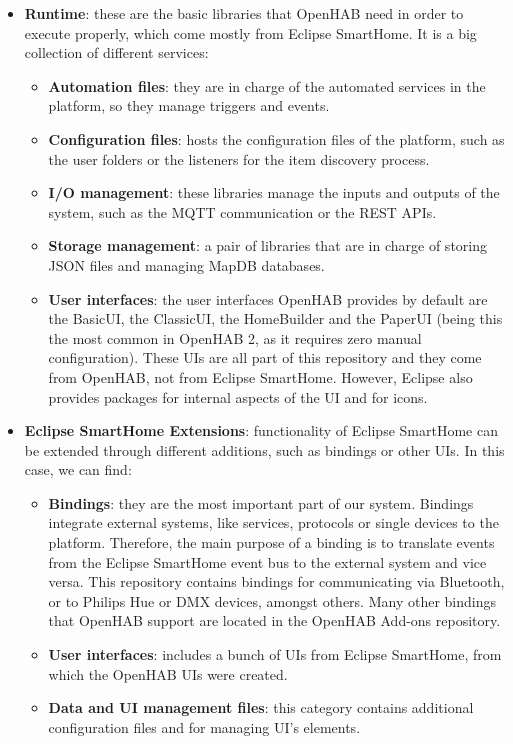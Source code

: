 \begin{itemize}
	\item \textbf{Runtime}: these are the basic libraries that OpenHAB need in order to execute properly, which come mostly from Eclipse
	SmartHome. It is a big collection of different services:
	\begin{itemize}
		\item \textbf{Automation files}: they are in charge of the automated services in the platform, so they manage triggers and events.
		\item \textbf{Configuration files}: hosts the configuration files of the platform, such as the user folders or the listeners for the
		item discovery process.
		\item \textbf{I/O management}: these libraries manage the inputs and outputs of the system, such as the MQTT communication
		or the REST APIs.
		\item \textbf{Storage management}: a pair of libraries that are in charge of storing JSON files and managing MapDB databases.
		\item \textbf{User interfaces}: the user interfaces OpenHAB provides by default are the BasicUI, the ClassicUI, the HomeBuilder
		and the PaperUI (being this the most common in OpenHAB 2, as it requires zero manual configuration). These UIs are all part
		of this repository and they come from OpenHAB, not from Eclipse SmartHome. However, Eclipse also provides packages for
		internal aspects of the UI and for icons.
	\end{itemize}
	\item \textbf{Eclipse SmartHome Extensions}: functionality of Eclipse SmartHome can be extended through different additions, such
	as bindings or other UIs. In this case, we can find:
	\begin{itemize}
		\item \textbf{Bindings}: they are the most important part of our system. Bindings integrate external systems, like services, protocols
		or single devices to the platform. Therefore, the main purpose of a binding is to translate events from the Eclipse SmartHome
		event bus to the external system and vice versa. This repository contains bindings for communicating via Bluetooth, or to Philips
		Hue or DMX devices, amongst others. Many other bindings that OpenHAB support are located in the OpenHAB Add-ons repository.
		\item \textbf{User interfaces}: includes a bunch of UIs from Eclipse SmartHome, from which the OpenHAB UIs were created.
		\item \textbf{Data and UI management files}: this category contains additional configuration files and for managing UI’s elements.

\end{itemize}
\end{itemize}
